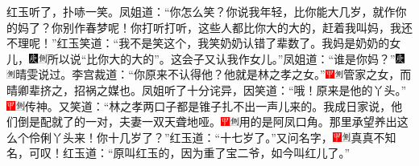 红玉听了，扑哧一笑。凤姐道：“你怎么笑？你说我年轻，比你能大几岁，就作你的妈了？你别作春梦呢！你打听打听，这些人都比你大的大的，赶着我叫妈，我还不理呢！”红玉笑道：“我不是笑这个，我笑奶奶认错了辈数了。我妈是奶奶的女儿，{\includegraphics[width=3mm]{../Images/00004}\includegraphics[width=3mm]{../Images/00011}\footnotesize \kaishu 所以说“比你大的大的”。}这会子又认我作女儿。”凤姐道：“谁是你妈？”{\includegraphics[width=3mm]{../Images/00004}\includegraphics[width=3mm]{../Images/00011}\footnotesize \kaishu 晴雯说过。}李宫裁道：“你原来不认得他？他就是林之孝之女。”{\includegraphics[width=3mm]{../Images/00002}\includegraphics[width=3mm]{../Images/00011}\footnotesize \kaishu 管家之女，而晴卿辈挤之，招祸之媒也。}凤姐听了十分诧异，因笑道：“哦！原来是他的丫头。”{\includegraphics[width=3mm]{../Images/00002}\includegraphics[width=3mm]{../Images/00011}\footnotesize \kaishu 传神。}又笑道：“林之孝两口子都是锥子扎不出一声儿来的。我成日家说，他们倒是配就了的一对，夫妻一双天聋地哑。{\includegraphics[width=3mm]{../Images/00002}\includegraphics[width=3mm]{../Images/00011}\footnotesize \kaishu 用的是阿凤口角。}那里承望养出这么个伶俐丫头来！你十几岁了？”红玉道：“十七岁了。”又问名字，{\includegraphics[width=3mm]{../Images/00002}\includegraphics[width=3mm]{../Images/00011}\footnotesize \kaishu 真真不知名，可叹！}红玉道：“原叫红玉的，因为重了宝二爷，如今叫红儿了。”


